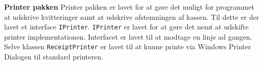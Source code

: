 \textbf{Printer pakken}
\newline
Printer pakken er lavet for at gøre det muligt for programmet at udskrive kvitteringer samt at udskrive afstemningen af kassen.
Til dette er der lavet et interface \texttt{IPrinter}. \texttt{IPrinter} er lavet for at gøre det nemt at udskifte printer implementationen.
Interfacet er lavet til at modtage en linje ad gangen.
Selve klassen \texttt{ReceiptPrinter} er lavet til at kunne printe via Windows Printer Dialogen til standard printeren.

